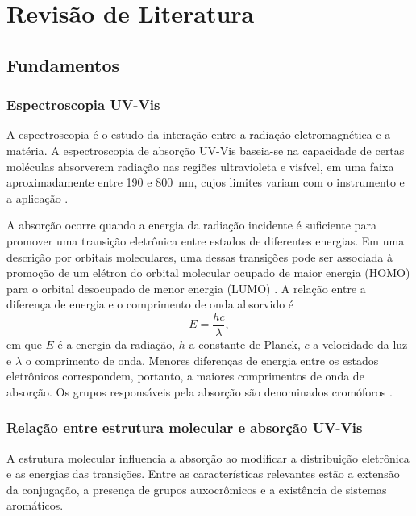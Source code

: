 \chapter{Revisão de Literatura}
\label{cap:revisao-literatura}

\section{Fundamentos}
\label{sec:fundamentos}

\subsection{Espectroscopia UV-Vis}
\label{sec:uvvis}

A espectroscopia é o estudo da interação entre a radiação eletromagnética e a matéria. A espectroscopia de absorção UV-Vis baseia-se na capacidade de certas moléculas absorverem radiação nas regiões ultravioleta e visível, em uma faixa aproximadamente entre 190 e 800~nm, cujos limites variam com o instrumento e a aplicação \cite{rocha_2018,sanchez_rojas_2009}.

A absorção ocorre quando a energia da radiação incidente é suficiente para promover uma transição eletrônica entre estados de diferentes energias. Em uma descrição por orbitais moleculares, uma dessas transições pode ser associada à promoção de um elétron do orbital molecular ocupado de maior energia (HOMO) para o orbital desocupado de menor energia (LUMO) \cite{pavia_2015,atkins_depaula_2018}. A relação entre a diferença de energia e o comprimento de onda absorvido é
\begin{equation}
	E = \frac{hc}{\lambda},
\end{equation}
em que $E$ é a energia da radiação, $h$ a constante de Planck, $c$ a velocidade da luz e $\lambda$ o comprimento de onda. Menores diferenças de energia entre os estados eletrônicos correspondem, portanto, a maiores comprimentos de onda de absorção. Os grupos responsáveis pela absorção são denominados cromóforos \cite{pavia_2015,skoog_2017}.

\subsection{Relação entre estrutura molecular e absorção UV-Vis}
\label{sec:estrutura-absorcao}

A estrutura molecular influencia a absorção ao modificar a distribuição eletrônica e as energias das transições. Entre as características relevantes estão a extensão da conjugação, a presença de grupos auxocrômicos e a existência de sistemas aromáticos.

